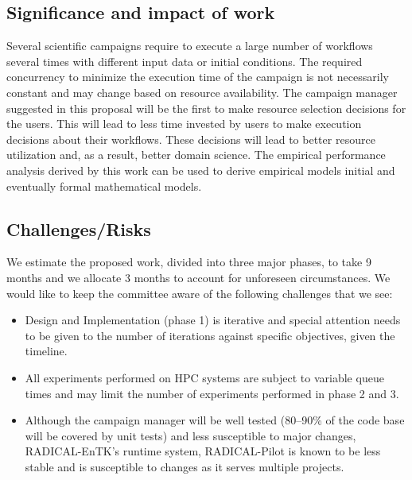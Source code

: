 \subsection{Significance and impact of work}
Several scientific campaigns require to execute a large number of workflows several times with different input data or initial conditions. 
The required concurrency to minimize the execution time of the campaign is not necessarily constant and may change based on resource availability. 
The campaign manager suggested in this proposal will be the first to make resource selection decisions for the users. 
This will lead to less time invested by users to make execution decisions about their workflows. 
These decisions will lead to better resource utilization and, as a result, better domain science. 
The empirical performance analysis derived by this work can be used to derive empirical models initial and eventually formal mathematical models.

\subsection{Challenges/Risks}

We estimate the proposed work, divided into three major phases, to take 9 months 
and we allocate 3 months to account for unforeseen circumstances. We would like 
to keep the committee aware of the following challenges that we see:

\begin{itemize}
	\item Design and Implementation (phase 1) is iterative and special attention needs to be given to the number of iterations against specific objectives, given the timeline.
    \item All experiments performed on HPC systems are subject to variable queue times and may limit the number of experiments performed in phase 2 and 3.
	\item Although the campaign manager will be well tested (80--90\% of the code base will be covered by unit tests) and less susceptible to major changes, RADICAL-EnTK's runtime system, RADICAL-Pilot is known to be less stable and is susceptible to changes as it serves multiple projects.
\end{itemize}